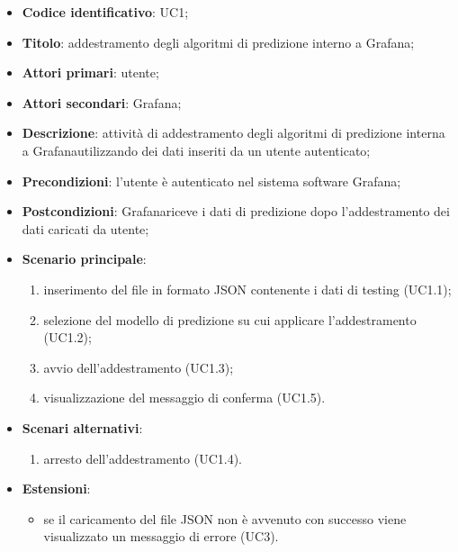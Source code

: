\begin{itemize}
	\item \textbf{Codice identificativo}: UC1;
	\item \textbf{Titolo}: addestramento degli algoritmi di predizione interno a Grafana\glo;
	\item \textbf{Attori primari}: utente;
	\item \textbf{Attori secondari}: Grafana\glo;
	\item \textbf{Descrizione}: attività di addestramento degli algoritmi di predizione interna a Grafana\glosp utilizzando dei dati inseriti da un utente autenticato;
	\item \textbf{Precondizioni}: l'utente è autenticato nel sistema software Grafana\glo;
	\item \textbf{Postcondizioni}: Grafana\glosp riceve i dati di predizione dopo l'addestramento dei dati caricati da utente;
	\item \textbf{Scenario principale}: 
		\begin{enumerate}
			\item inserimento del file in formato JSON contenente i dati di testing (UC1.1);
			\item selezione del modello di predizione su cui applicare l'addestramento (UC1.2);
			\item avvio dell'addestramento (UC1.3);
			\item visualizzazione del messaggio di conferma (UC1.5).
		\end{enumerate}
	\item \textbf{Scenari alternativi}:
		\begin{enumerate}
			\item arresto dell'addestramento (UC1.4).
		\end{enumerate}
	\item \textbf{Estensioni}:
	\begin{itemize}
		\item se il caricamento del file JSON non è avvenuto con successo viene visualizzato un messaggio di errore (UC3).
	\end{itemize}
\end{itemize}

